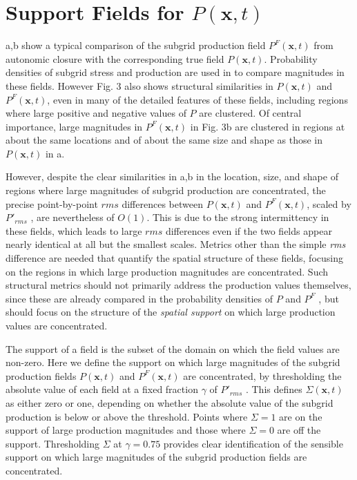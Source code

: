 \section{Support Fields for $P(\mathbf{x},t)$} 
\label{sec:IIIC}

a,b show a typical comparison of the subgrid production field $P^{F}(\mathbf{x},t)$ from autonomic closure with the corresponding true field $P(\mathbf{x},t)$. Probability densities of subgrid stress and production are used in  to compare magnitudes in these fields. However Fig. 3 also shows structural similarities in  $P(\mathbf{x},t)$ and $P^{F}(\mathbf{x},t)$, even in many of the detailed features of these fields, including regions where large positive and negative values of $P$ are clustered. Of central importance, large magnitudes in $P^{F}(\mathbf{x},t)$  in Fig. 3b are clustered in regions at about the same locations and of about the same size and shape as those in $P(\mathbf{x},t)$ in a. 

However, despite the clear similarities in a,b in the location, size, and shape of regions where large magnitudes of subgrid production are concentrated, the precise point-by-point $rms$ differences between  $P(\mathbf{x},t)$ and $P^F(\mathbf{x},t)$, scaled by $P'_{rms}$ , are nevertheless of $O(1)$. This is due to the strong intermittency in these fields, which leads to large $rms$ differences even if the two fields appear nearly identical at all but the smallest scales. Metrics other than the simple \textit{rms} difference are needed that quantify the spatial structure of these fields, focusing on the regions in which large production magnitudes are concentrated. Such structural metrics should not primarily address the production values themselves, since these are already compared in the probability densities of $P$ and $P^F$  , but should focus on the structure of the \textit{spatial support} on which large production values are concentrated.  

The support of a field is the subset of the domain on which the field values are non-zero. Here we define the support on which large magnitudes of the subgrid production fields  $P(\mathbf{x},t)$ and $P^F(\mathbf{x},t)$ are concentrated, by thresholding the absolute value of each field at a fixed fraction  $\gamma$ of $P'_{rms}$ . This defines $\Sigma(\mathbf{x},t)$  as either zero or one, depending on whether the absolute value of the subgrid production is below or above the threshold. Points where  $\Sigma = 1$ are on the support of large production magnitudes and those where  $\Sigma = 0$  are off the support. Thresholding $\Sigma$  at $\gamma = 0.75$   provides clear identification of the sensible support on which large magnitudes of the subgrid production fields are concentrated. 

